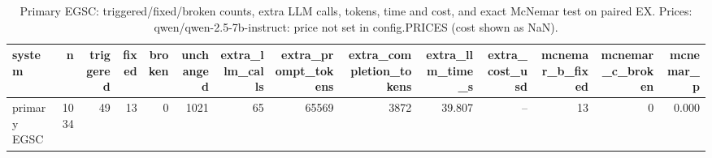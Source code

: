 \begin{table}[htbp]
\caption{Primary EGSC: triggered/fixed/broken counts, extra LLM calls, tokens, time and cost, and exact McNemar test on paired EX. Prices: qwen/qwen-2.5-7b-instruct: price not set in config.PRICES (cost shown as NaN).}
\label{tab:task3_egsc_counts}
\begin{tabular}{lrrrrrrrrrrrrr}
\toprule
system & n & triggered & fixed & broken & unchanged & extra\_llm\_calls & extra\_prompt\_tokens & extra\_completion\_tokens & extra\_llm\_time\_s & extra\_cost\_usd & mcnemar\_b\_fixed & mcnemar\_c\_broken & mcnemar\_p \\
\midrule
primary EGSC & 1034 & 49 & 13 & 0 & 1021 & 65 & 65569 & 3872 & 39.807 & -- & 13 & 0 & 0.000 \\
\bottomrule
\end{tabular}
\end{table}
